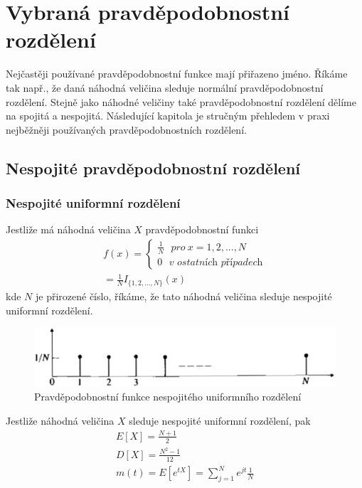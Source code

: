 \chapter{Vybraná pravděpodobnostní rozdělení}

Nejčastěji používané pravděpodobnostní funkce mají přiřazeno jméno. Říkáme tak např., že daná náhodná veličina sleduje normální pravděpodobnostní rozdělení. Stejně jako náhodné veličiny také pravděpodobnostní rozdělení dělíme na spojitá a nespojitá. Následující kapitola je stručným přehledem v praxi nejběžněji používaných pravděpodobnostních rozdělení.

\section{Nespojité pravděpodobnostní rozdělení}

\subsection{Nespojité uniformní rozdělení}

\begin{definition}
Jestliže má náhodná veličina $X$ pravděpodobnostní funkci
\begin{gather*}
f(x) =
\begin{cases}
\frac{1}{N}~~~\textit{pro}~x = 1,2, ..., N\\
0~~~\textit{v ostatních případech}
\end{cases}\\
=\frac{1}{N}I_{\{1, 2, ..., N\}}(x)
\end{gather*}
kde $N$ je přirozené číslo, říkáme, že tato náhodná veličina sleduje nespojité uniformní rozdělení.
\end{definition}

\begin{figure}[htp]
\centering
\includegraphics[scale = 0.5]{pictures/discrete_uniform_distribution.eps}
\caption{Pravděpodobnostní funkce nespojitého uniformního rozdělení}
\label{discrete_uniform_distribution}
\end{figure}  

\begin{theorem}
Jestliže náhodná veličina $X$ sleduje nespojité uniformní rozdělení, pak
\begin{gather*}
E[X] = \frac{N+1}{2}\\
D[X] = \frac{N^2 - 1}{12}\\
m(t) = E[e^{tX}] = \sum_{j = 1}^N e^{jt}\frac{1}{N}
\end{gather*}
\end{theorem}

